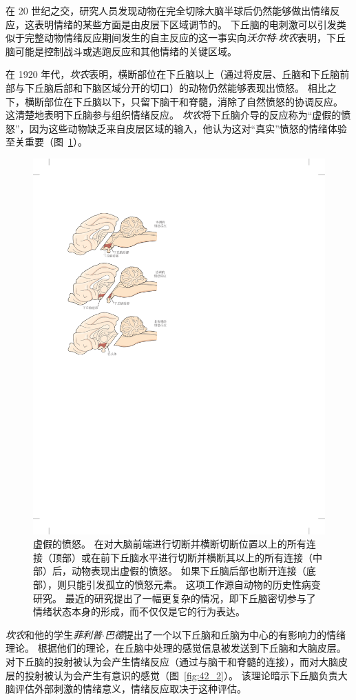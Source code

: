 在 20 世纪之交，研究人员发现动物在完全切除大脑半球后仍然能够做出情绪反应，这表明情绪的某些方面是由皮层下区域调节的。
下丘脑的电刺激可以引发类似于完整动物情绪反应期间发生的自主反应的这一事实向\textit{沃尔特$\cdot$坎农}表明，下丘脑可能是控制战斗或逃跑反应和其他情绪的关键区域。


在 1920 年代，\textit{坎农}表明，横断部位在下丘脑以上（通过将皮层、丘脑和下丘脑前部与下丘脑后部和下脑区域分开的切口）的动物仍然能够表现出愤怒。
相比之下，横断部位在下丘脑以下，只留下脑干和脊髓，消除了自然愤怒的协调反应。
这清楚地表明下丘脑参与组织情绪反应。
\textit{坎农}将下丘脑介导的反应称为“虚假的愤怒”，因为这些动物缺乏来自皮层区域的输入，他认为这对“真实”愤怒的情绪体验至关重要（图~\ref{fig:42_3}）。


\begin{figure}[htbp]
	\centering
	\includegraphics[width=0.67\linewidth]{chap42/fig_42_3}
	\caption{虚假的愤怒。
		在对大脑前端进行切断并横断切断位置以上的所有连接（顶部）或在前下丘脑水平进行切断并横断其以上的所有连接（中部）后，动物表现出虚假的愤怒。
		如果下丘脑后部也断开连接（底部），则只能引发孤立的愤怒元素。
		这项工作源自动物的历史性病变研究。
		最近的研究提出了一幅更复杂的情况，即下丘脑密切参与了情绪状态本身的形成，而不仅仅是它的行为表达。}
	\label{fig:42_3}
\end{figure}


\textit{坎农}和他的学生\textit{菲利普$\cdot$巴德}提出了一个以下丘脑和丘脑为中心的有影响力的情绪理论。
根据他们的理论，在丘脑中处理的感觉信息被发送到下丘脑和大脑皮层。
对下丘脑的投射被认为会产生情绪反应（通过与脑干和脊髓的连接），而对大脑皮层的投射被认为会产生有意识的感觉（图~\ref{fig:42_2}）。
该理论暗示下丘脑负责大脑评估外部刺激的情绪意义，情绪反应取决于这种评估。


